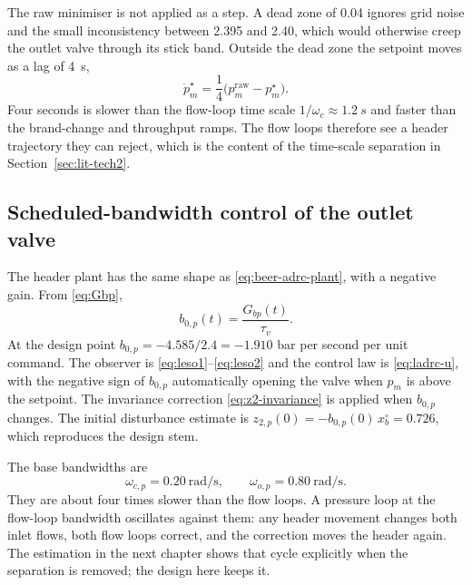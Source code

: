 The raw minimiser is not applied as a step. A dead zone of \SI{0.04}{\barg} ignores grid noise and the small inconsistency between \SI{2.395}{\barg} and \SI{2.40}{\barg}, which would otherwise creep the outlet valve through its stick band. Outside the dead zone the setpoint moves as a lag of \SI{4}{s},
\begin{equation}
\label{eq:pref-lag}
\dot{p}_m^\star = \frac{1}{4}\big(p_m^{\mathrm{raw}} - p_m^\star\big).
\end{equation}
Four seconds is slower than the flow-loop time scale $1/\omega_c \approx \SI{1.2}{s}$ and faster than the brand-change and throughput ramps. The flow loops therefore see a header trajectory they can reject, which is the content of the time-scale separation in Section~\ref{sec:lit-tech2}.

\subsection{Scheduled-bandwidth control of the outlet valve}

The header plant has the same shape as \eqref{eq:beer-adrc-plant}, with a negative gain. From \eqref{eq:Gbp},
\begin{equation}
\label{eq:b0p}
b_{0,p}(t) = \frac{G_{bp}(t)}{\tau_v}.
\end{equation}
At the design point $b_{0,p} = -4.585/2.4 = -1.910$ bar per second per unit command. The observer is \eqref{eq:leso1}--\eqref{eq:leso2} and the control law is \eqref{eq:ladrc-u}, with the negative sign of $b_{0,p}$ automatically opening the valve when $p_m$ is above the setpoint. The invariance correction \eqref{eq:z2-invariance} is applied when $b_{0,p}$ changes. The initial disturbance estimate is $z_{2,p}(0) = -b_{0,p}(0)\, x_b^\circ = 0.726$, which reproduces the design stem.

The base bandwidths are
\begin{equation}
\label{eq:p-bw}
\omega_{c,p} = 0.20\ \si{\radian\per\second}, \qquad \omega_{o,p} = 0.80\ \si{\radian\per\second}.
\end{equation}
They are about four times slower than the flow loops. A pressure loop at the flow-loop bandwidth oscillates against them: any header movement changes both inlet flows, both flow loops correct, and the correction moves the header again. The estimation in the next chapter shows that cycle explicitly when the separation is removed; the design here keeps it.

